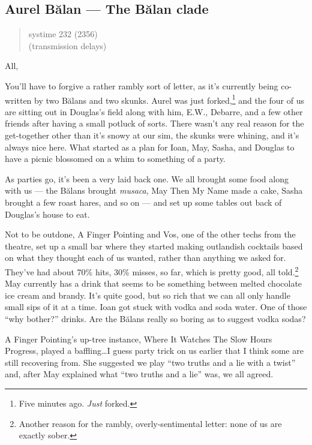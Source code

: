 \hypertarget{aurel-bux103lan-the-bux103lan-clade}{%
\subsection{Aurel Bălan — The Bălan clade}\label{aurel-bux103lan-the-bux103lan-clade}}

\begin{quote}
systime 232 (2356)\\
(transmission delays)
\end{quote}

All,

You'll have to forgive a rather rambly sort of letter, as it's currently being co-written by two Bălans and two skunks. Aurel was just forked,\footnote{Five minutes ago. \emph{Just} forked.} and the four of us are sitting out in Douglas's field along with him, E.W., Debarre, and a few other friends after having a small potluck of sorts. There wasn't any real reason for the get-together other than it's snowy at our sim, the skunks were whining, and it's always nice here. What started as a plan for Ioan, May, Sasha, and Douglas to have a picnic blossomed on a whim to something of a party.

As parties go, it's been a very laid back one. We all brought some food along with us — the Bălans brought \emph{musaca}, May Then My Name made a cake, Sasha brought a few roast hares, and so on — and set up some tables out back of Douglas's house to eat.

Not to be outdone, A Finger Pointing and Vos, one of the other techs from the theatre, set up a small bar where they started making outlandish cocktails based on what they thought each of us wanted, rather than anything we asked for. They've had about 70\% hits, 30\% misses, so far, which is pretty good, all told.\footnote{Another reason for the rambly, overly-sentimental letter: none of us are exactly sober.} May currently has a drink that seems to be something between melted chocolate ice cream and brandy. It's quite good, but so rich that we can all only handle small sips of it at a time. Ioan got stuck with vodka and soda water. One of those ``why bother?'' drinks. Are the Bălans really so boring as to suggest vodka sodas?

A Finger Pointing's up-tree instance, Where It Watches The Slow Hours Progress, played a baffling\ldots I guess party trick on us earlier that I think some are still recovering from. She suggested we play ``two truths and a lie with a twist'' and, after May explained what ``two truths and a lie'' was, we all agreed.

